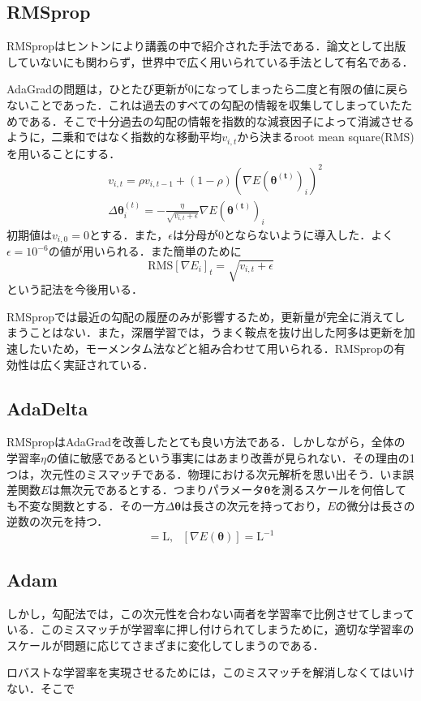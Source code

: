 \documentclass[a4paper,11pt]{jsreport}
\begin{document}
\subsection{RMSprop}
RMSpropはヒントンにより講義の中で紹介された手法である．論文として出版していないにも関わらず，世界中で広く用いられている手法として有名である．\par
AdaGradの問題は，ひとたび更新が$0$になってしまったら二度と有限の値に戻らないことであった．これは過去のすべての勾配の情報を収集してしまっていたためである．そこで十分過去の勾配の情報を指数的な減衰因子によって消滅させるように，二乗和ではなく指数的な移動平均$v_{i,t}$から決まるroot mean square(RMS)を用いることにする．
\begin{align}
   & v_{i,t}
  = \rho v_{i,t-1} + (1-\rho) (\nabla E(\bm{\theta^{(t)}})_i)^2 \\
   & \Delta \bm{\theta}_i^{(t)}
  = - \frac{\eta}{\sqrt{v_{i,t}+\epsilon}} \nabla E(\bm{\theta^{(t)}})_i
\end{align}
初期値は$v_{i,0}=0$とする．また，$\epsilon$は分母が$0$とならないように導入した．よく$\epsilon = 10^{-6}$の値が用いられる．また簡単のために
\begin{equation}
  \mathrm{RMS}[\nabla E_i]_t = \sqrt{v_{i,t} + \epsilon}
\end{equation}
という記法を今後用いる．\par
RMSpropでは最近の勾配の履歴のみが影響するため，更新量が完全に消えてしまうことはない．また，深層学習では，うまく鞍点を抜け出した阿多は更新を加速したいため，モーメンタム法などと組み合わせて用いられる．RMSpropの有効性は広く実証されている．

\subsection{AdaDelta}
RMSpropはAdaGradを改善したとても良い方法である．しかしながら，全体の学習率$\eta$の値に敏感であるという事実にはあまり改善が見られない．その理由の1つは，次元性のミスマッチである．物理における次元解析を思い出そう．いま誤差関数$E$は無次元であるとする．つまりパラメータ$\bm{\theta}$を測るスケールを何倍しても不変な関数とする．その一方$\Delta \bm{\theta}$は長さの次元を持っており，$E$の微分は長さの逆数の次元を持つ．
\begin{equation}
  [\Delta \bm{\theta}] = \mathrm{L}, \ \ \ [\nabla E(\bm{\theta})] = \mathrm{L}^{-1}
\end{equation}
\subsection{Adam}
しかし，勾配法では，この次元性を合わない両者を学習率で比例させてしまっている．このミスマッチが学習率に押し付けられてしまうために，適切な学習率のスケールが問題に応じてさまざまに変化してしまうのである．\par
ロバストな学習率を実現させるためには，このミスマッチを解消しなくてはいけない．そこで
\end{document}
